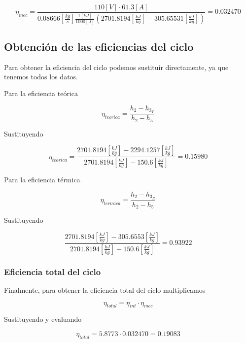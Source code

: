 \documentclass[12pt,letterpaper]{article}
\begin{document}

$$
    \eta_{mec} = \frac{
        110[V]\cdot 61.3[A]
    }{
        0.08666 \left[\frac{kg}{s}\right] \frac{1[kJ]}{1000[J]}
        ( 2701.8194 \left[\frac{kJ}{kg}\right] - 305.65531 \left[\frac{kJ}{kg}\right] )
    }
    = 
    0.032470
$$

\subsection{Obtención de las eficiencias del ciclo}

Para obtener la eficiencia del ciclo podemos sustituir directamente, ya que tenemos todos los datos.

Para la eficiencia teórica

\begin{equation}
    \eta_{teorica} = \frac{h_2 - h_{3_T}}{h_2 - h_5} 
\end{equation}

Sustituyendo 

$$
    \eta_{teorica} = \frac{
        2701.8194 \left[\frac{kJ}{kg}\right] - 2294.1257 \left[\frac{kJ}{kg}\right]
    }{
        2701.8194 \left[\frac{kJ}{kg}\right] - 150.6 \left[\frac{kJ}{kg}\right]
    } 
    = 
    0.15980
$$

Para la eficiencia térmica

\begin{equation}
    \eta_{termica} = \frac{h_2 - h_{3_R}}{h_2 - h_5} 
\end{equation}

Sustituyendo

$$
    \frac{
        2701.8194 \left[\frac{kJ}{kg}\right] - 305.6553 \left[\frac{kJ}{kg}\right]
    }{
        2701.8194 \left[\frac{kJ}{kg}\right] - 150.6 \left[\frac{kJ}{kg}\right]
    }
    = 
    0.93922
$$

\subsubsection{Eficiencia total del ciclo}

Finalmente, para obtener la eficiencia total del ciclo multiplicamos

\begin{equation}
    \eta_{total} = \eta_{int} \cdot \eta_{mec}
\end{equation}

Sustituyendo y evaluando

$$
    \eta_{total} = 5.8773 \cdot 0.032470 = 0.19083
$$
\end{document}
